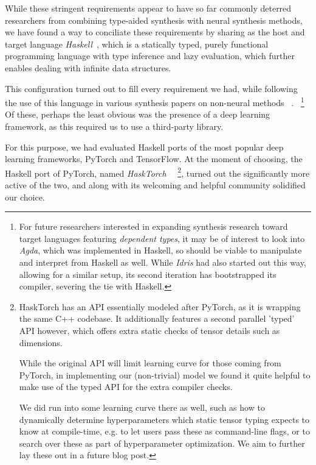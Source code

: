 \documentclass{article}
\begin{document}
While these stringent requirements appear to have so far commonly deterred
researchers from combining type-aided synthesis with neural synthesis methods,
we have found a way to conciliate these requirements
by sharing as the host and target language
\emph{Haskell}~\citep{jones2003haskell}, which is a statically typed,
purely functional programming language with type inference and lazy evaluation,
which further enables dealing with infinite data structures.

This configuration turned out to fill every requirement we had,
while following the use of this language in various synthesis papers on non-neural methods%
~\citep{synquid,hornclauses,scythe,gissurarson2018suggesting}.%
~\footnote{
    For future researchers interested in expanding synthesis research toward target languages featuring \emph{dependent types},
    it may be of interest to look into \emph{Agda},
    which was implemented in Haskell,
    so should be viable to manipulate and interpret from Haskell as well.
    While \emph{Idris} had also started out this way,
    allowing for a similar setup,
    its second iteration has bootstrapped its compiler,
    severing the tie with Haskell.
}
Of these, perhaps the least obvious was the presence of a deep learning framework,
as this required us to use a third-party library.

For this purpose, we had evaluated Haskell ports of
the most popular deep learning frameworks, PyTorch and TensorFlow.
At the moment of choosing, the Haskell port of PyTorch,
named \emph{HaskTorch}~\citep{hasktorch}%
~\footnote{
    HaskTorch has an API essentially modeled after PyTorch, as it is wrapping the same C++ codebase.
    It additionally features a second parallel 'typed' API however,
    which offers extra static checks of tensor details such as dimensions.

    While the original API will limit learning curve for those coming from PyTorch,
    in implementing our (non-trivial) model we found it quite helpful
    to make use of the typed API for the extra compiler checks.

    We did run into some learning curve there as well,
    such as how to dynamically determine hyperparameters
    which static tensor typing expects to know at compile-time,
    e.g. to let users pass these as command-line flags,
    or to search over these as part of hyperparameter optimization.
    We aim to further lay these out in a future blog post.
},
turned out the significantly more active of the two,
and along with its welcoming and helpful community solidified our choice.
\end{document}
